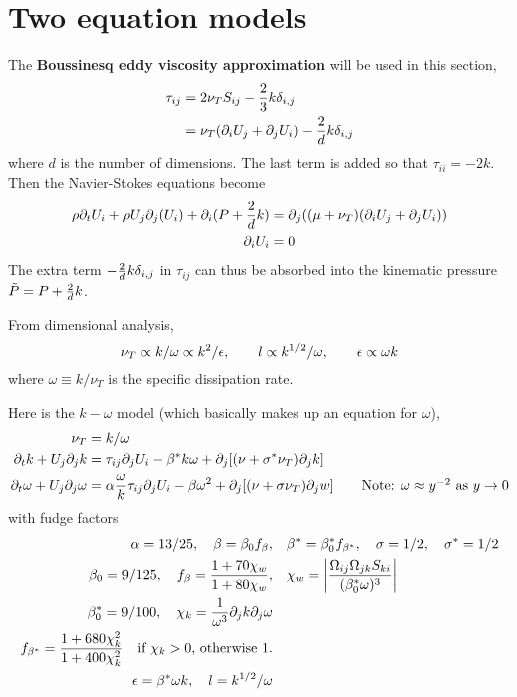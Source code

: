 \documentclass{article}
\begin{document}
\section{Two equation models}

The {\bf Boussinesq eddy viscosity approximation} will be used in this section,
\begin{align*}
   \tau_{ij} & = 2\nu_T S_{ij} - {2\over3} k \delta_{i,j} \\
             & = \nu_T( \partial_i U_j + \partial_j U_i ) - {2\over d} k \delta_{i,j}
\end{align*}  
where $d$ is the number of dimensions. The last term is added so that $\tau_{ii} = -2k$.
Then the Navier-Stokes equations become
\begin{align*}
   \rho \partial_t U_i + \rho U_j \partial_j(U_i) + \partial_i (P+{2\over d} k) 
    &= \partial_j( (\mu+\nu_T) (\partial_i U_j + \partial_j U_i) ) \\
  \partial_i U_i &= 0
\end{align*}
The extra term $- {2\over d} k \delta_{i,j}$ in $\tau_{ij}$ can thus be absorbed into 
the kinematic pressure $\tilde{P}=P+{2\over d} k$.

From dimensional analysis,
\[
   \nu_T \propto k/\omega\propto k^2/\epsilon , \qquad l \propto k^{1/2}/\omega, \qquad \epsilon \propto \omega k
\]
where $\omega\equiv k/\nu_T$ is the specific dissipation rate. 

Here is the $k-\omega$ model (which basically makes up an equation for $\omega$),
\begin{align*}
   \nu_T &= k/\omega \\
   \partial_t k + U_j\partial_j k  &= \tau_{ij} \partial_j U_i -\beta^* k \omega 
                    + \partial_j[ (\nu+\sigma^* \nu_T)\partial_j k] \\
    \partial_t \omega + U_j\partial_j \omega  &= \alpha{\omega\over k}\tau_{ij} \partial_j U_i 
           -\beta \omega ^2 + \partial_j[ (\nu+\sigma \nu_T)\partial_j w] \qquad\mbox{Note: $\omega\approx y^{-2}$
     as $y\rightarrow 0$}\\  
\end{align*}
with fudge factors
\begin{align*}
   \alpha=13/25, \quad \beta=\beta_0 f_\beta, & \quad \beta^*=\beta_0^* f_{\beta^*},
               \quad \sigma=1/2, \quad \sigma^*=1/2\\
    \beta_0 = 9/125, \quad f_\beta ={1+70\chi_w\over 1+80\chi_w}, &
               \quad \chi_w=\left| {\Omega_{ij}\Omega_{jk}S_{ki}\over (\beta_0^*\omega)^3}\right| \\
   \beta_0^*=9/100, \quad \chi_k = {1\over\omega^3} \partial_j k \partial_j \omega \\
   f_{\beta^*} = {1+680 \chi_k^2 \over 1+400 \chi_k^2} \quad \mbox{if $\chi_k>0$, otherwise 1.} \\
  \epsilon=\beta^*\omega k, \quad l=k^{1/2}/\omega
\end{align*}
\end{document}
